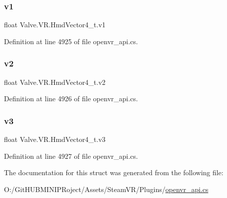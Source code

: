 \mbox{\label{struct_valve_1_1_v_r_1_1_hmd_vector4__t_a6dc884354795b6fd1c9e5851987235b5}} 
\subsubsection{\texorpdfstring{v1}{v1}}
{\footnotesize\ttfamily float Valve.\+V\+R.\+Hmd\+Vector4\+\_\+t.\+v1}



Definition at line 4925 of file openvr\+\_\+api.\+cs.

\mbox{\label{struct_valve_1_1_v_r_1_1_hmd_vector4__t_a3a50736d45a40f39e496faa6637ac6c3}} 
\subsubsection{\texorpdfstring{v2}{v2}}
{\footnotesize\ttfamily float Valve.\+V\+R.\+Hmd\+Vector4\+\_\+t.\+v2}



Definition at line 4926 of file openvr\+\_\+api.\+cs.

\mbox{\label{struct_valve_1_1_v_r_1_1_hmd_vector4__t_a940ee5e07ddd36a4097eb6f917ea271c}} 
\subsubsection{\texorpdfstring{v3}{v3}}
{\footnotesize\ttfamily float Valve.\+V\+R.\+Hmd\+Vector4\+\_\+t.\+v3}



Definition at line 4927 of file openvr\+\_\+api.\+cs.



The documentation for this struct was generated from the following file\+:\begin{DoxyCompactItemize}
\item 
O\+:/\+Git\+H\+U\+B\+M\+I\+N\+I\+P\+Roject/\+Assets/\+Steam\+V\+R/\+Plugins/\mbox{\hyperlink{openvr__api_8cs}{openvr\+\_\+api.\+cs}}\end{DoxyCompactItemize}
